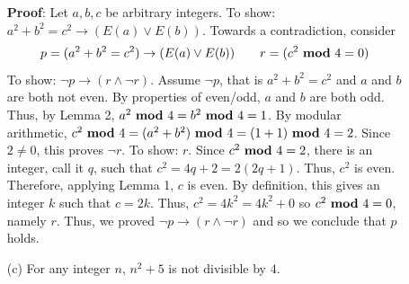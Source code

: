 \begin{description}
\begin{enumerate}
{  
  {\bf Proof}: Let $a,b,c$ be arbitrary integers.  To show: $a^2 +  b^2 = c^2  \to (E(a) \vee E(b) )$.
  Towards a contradiction, consider
  \[
  p  =   ( a^2 +  b^2 = c^2)  \to (E(a) \vee E(b) ) \qquad  r= (c^2~\text{\bf mod}~4 = 0)
  \]
  To show:  $\neg p \to  (r \land \neg r)$.  Assume $\neg p$, that is 
  $a^2 + b^2 =c^2$ and $a$ and $b$ are both not even.  
  By properties of even/odd, $a$ and $b$ are both odd.  Thus, by Lemma 2,
  $a^2~\text{\bf mod}~4 = b^2 ~\text{\bf mod}~4 = 1$.  By modular arithmetic,
  $c^2 ~\text{\bf mod}~4 = (a^2  + b^2)~\text{\bf mod}~4 = (1 + 1) ~\text{\bf mod}~4 = 2$.
  Since $2 \neq 0$,  this proves $\neg r$.  To show:  $r$.
  Since $c^2~\text{\bf mod}~4 =  2$, there is an integer, call it $q$, such that $c^2 = 4q + 2 = 2(2q+1)$. Thus,
  $c^2$ is even.  Therefore, applying Lemma 1, $c$ is even.
  By definition, this gives an integer $k$ such that $c = 2k$.  Thus, $c^2 = 4k^2 = 4k^2  +0$
  so $c^2~\text{\bf mod}~4 = 0$, namely $r$. Thus, we proved $\neg p \to  (r \land  \neg r)$  and so 
  we conclude that $p$ holds.
  }
  \else{}
  \fi
  
  \item[(c)] For any integer $n$, $n^2 + 5$ is not divisible by $4$.
  

\end{enumerate}
\end{description}
